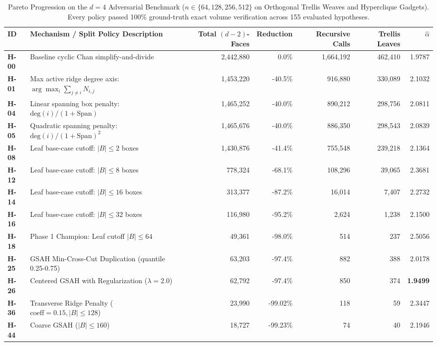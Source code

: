 \begin{table}[t]
\centering
\caption{Pareto Progression on the $d=4$ Adversarial Benchmark ($n \in \{64, 128, 256, 512\}$ on Orthogonal Trellis Weaves and Hyperclique Gadgets). Every policy passed 100\% ground-truth exact volume verification across 155 evaluated hypotheses.}
\label{tab:leaderboard}
\small
\begin{tabular}{llrrrrr}
\toprule
\textbf{ID} & \textbf{Mechanism / Split Policy Description} & \textbf{Total $(d-2)$-Faces} & \textbf{Reduction} & \textbf{Recursive Calls} & \textbf{Trellis Leaves} & $\hat{\alpha}$ \\
\midrule
\textbf{H-00} & Baseline cyclic Chan simplify-and-divide & 2,442,880 & 0.0\% & 1,664,192 & 462,410 & 1.9787 \\
\textbf{H-01} & Max active ridge degree axis: $\arg\max_i \sum_{j \ne i} N_{i,j}$ & 1,453,220 & -40.5\% & 916,880 & 330,089 & 2.1032 \\
\textbf{H-04} & Linear spanning box penalty: $\mathrm{deg}(i) / (1 + \text{Span})$ & 1,465,252 & -40.0\% & 890,212 & 298,756 & 2.0811 \\
\textbf{H-05} & Quadratic spanning penalty: $\mathrm{deg}(i) / (1 + \text{Span})^2$ & 1,465,676 & -40.0\% & 886,350 & 298,543 & 2.0839 \\
\textbf{H-08} & Leaf base-case cutoff: $|B| \le 2$ boxes & 1,430,876 & -41.4\% & 755,548 & 239,218 & 2.1364 \\
\textbf{H-12} & Leaf base-case cutoff: $|B| \le 8$ boxes & 778,324 & -68.1\% & 108,296 & 39,065 & 2.3681 \\
\textbf{H-14} & Leaf base-case cutoff: $|B| \le 16$ boxes & 313,377 & -87.2\% & 16,014 & 7,407 & 2.2732 \\
\textbf{H-16} & Leaf base-case cutoff: $|B| \le 32$ boxes & 116,980 & -95.2\% & 2,624 & 1,238 & 2.1500 \\
\textbf{H-18} & Phase 1 Champion: Leaf cutoff $|B| \le 64$ & 49,361 & -98.0\% & 514 & 237 & 2.5056 \\
\textbf{H-25} & GSAH Min-Cross-Cut Duplication (quantile 0.25-0.75) & 63,203 & -97.4\% & 882 & 388 & 2.0178 \\
\textbf{H-26} & Centered GSAH with Regularization ($\lambda = 2.0$) & 62,792 & -97.4\% & 850 & 374 & \textbf{1.9499} \\
\textbf{H-36} & Transverse Ridge Penalty ($\mathrm{coeff} = 0.15, |B| \le 128$) & 23,990 & -99.02\% & 118 & 59 & 2.3447 \\
\textbf{H-44} & Coarse GSAH ($|B| \le 160$) & 18,727 & -99.23\% & 74 & 40 & 2.1946 \\

\end{tabular}
\end{table}
